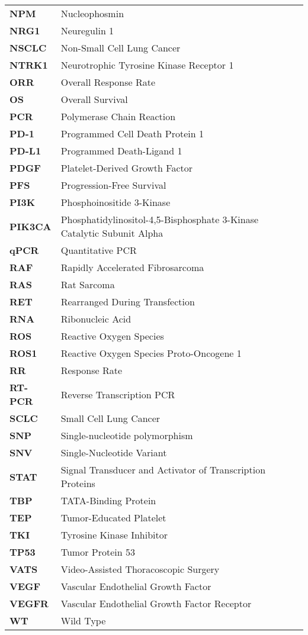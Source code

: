 \begin{longtable}[l]{l l}
    \textbf{NPM} & Nucleophosmin \\
    \textbf{NRG1} & Neuregulin 1 \\
    \textbf{NSCLC} & Non-Small Cell Lung Cancer \\
    \textbf{NTRK1} & Neurotrophic Tyrosine Kinase Receptor 1 \\
    \textbf{ORR} &  Overall Response Rate \\
    \textbf{OS} & Overall Survival \\
    \textbf{PCR} & Polymerase Chain Reaction \\
    \textbf{PD-1} & Programmed Cell Death Protein 1 \\
    \textbf{PD-L1} & Programmed Death-Ligand 1 \\
    \textbf{PDGF} & Platelet-Derived Growth Factor \\
    \textbf{PFS} & Progression-Free Survival \\
    \textbf{PI3K} & Phosphoinositide 3-Kinase \\
    \textbf{PIK3CA} & Phosphatidylinositol-4,5-Bisphosphate 3-Kinase Catalytic Subunit Alpha \\
    \textbf{qPCR} & Quantitative PCR \\
    \textbf{RAF} & Rapidly Accelerated Fibrosarcoma \\
    \textbf{RAS} & Rat Sarcoma \\
    \textbf{RET} & Rearranged During Transfection \\
    \textbf{RNA} & Ribonucleic Acid \\
    \textbf{ROS} & Reactive Oxygen Species \\
    \textbf{ROS1} & Reactive Oxygen Species Proto-Oncogene 1 \\
    \textbf{RR} & Response Rate \\
    \textbf{RT-PCR} & Reverse Transcription PCR \\
    \textbf{SCLC} & Small Cell Lung Cancer \\
    \textbf{SNP} & Single-nucleotide polymorphism \\
    \textbf{SNV} & Single-Nucleotide Variant \\
    \textbf{STAT} & Signal Transducer and Activator of Transcription Proteins \\
    \textbf{TBP} & TATA-Binding Protein \\
    \textbf{TEP} & Tumor-Educated Platelet \\
    \textbf{TKI} & Tyrosine Kinase Inhibitor \\
    \textbf{TP53} & Tumor Protein 53 \\
    \textbf{VATS} & Video-Assisted Thoracoscopic Surgery \\
    \textbf{VEGF} & Vascular Endothelial Growth Factor \\
    \textbf{VEGFR} & Vascular Endothelial Growth Factor Receptor \\
    \textbf{WT} & Wild Type 
\end{longtable}

\normalsize